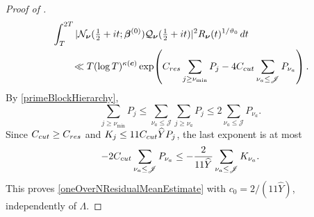 \documentclass[10pt,a4paper]{amsart}
\begin{document}
\begin{proof}[Proof of ]
			\begin{align*}
				&\int_T^{2T}
				|\mathcal N_{\boldsymbol\nu}(\tfrac12+it;
				\boldsymbol\beta^{(0)})
				\mathcal Q_{\boldsymbol\nu}(\tfrac12+it)|^2
				R_{\boldsymbol\nu}(t)^{1/\vartheta_0}\,dt\\
				&\qquad\ll T(\log T)^{\kappa(\boldsymbol c)}
				\exp\!\left(
				C_{\rm res}\sum_{j\geq\nu_{\min}}P_j
				-4C_{\rm cut}\sum_{\nu_a\leq\mathscr J}P_{\nu_a}
				\right).
			\end{align*}
			By \eqref{primeBlockHierarchy},
			\[
			\sum_{j\geq\nu_{\min}}P_j
			\leq\sum_{\nu_a\leq\mathscr J}\sum_{j\geq\nu_a}P_j
			\leq2\sum_{\nu_a\leq\mathscr J}P_{\nu_a}.
			\]
			Since $C_{\rm cut}\geq C_{\rm res}$ and
			$K_j\leq11C_{\rm cut}\widehat YP_j$, the last exponent is at most
			\[
			-2C_{\rm cut}\sum_{\nu_a\leq\mathscr J}P_{\nu_a}
			\leq-\frac2{11\widehat Y}\sum_{\nu_a\leq\mathscr J}K_{\nu_a}.
			\]
			This proves \eqref{oneOverNResidualMeanEstimate} with
			$c_0=2/(11\widehat Y)$, independently of $\Lambda$.
		\end{proof}
\end{document}
